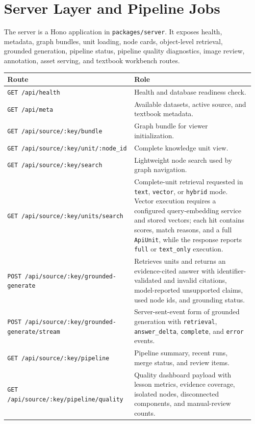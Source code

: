 \documentclass[11pt,letterpaper]{article}
\newcommand{\code}[1]{\nolinkurl{#1}}
\begin{document}
\section{Server Layer and Pipeline Jobs}
\label{sec:server-runtime}

The server is a Hono application in \code{packages/server}. It exposes health, metadata, graph bundles, unit loading, node cards, object-level retrieval, grounded generation, pipeline status, pipeline quality diagnostics, image review, annotation, asset serving, and textbook workbench routes.

\begin{table}[H]
\centering
\small
\begin{tabularx}{\textwidth}{@{}lY@{}}
\toprule
\textbf{Route} & \textbf{Role}\\
\midrule
\code{GET /api/health} & Health and database readiness check.\\
\code{GET /api/meta} & Available datasets, active source, and textbook metadata.\\
\code{GET /api/source/:key/bundle} & Graph bundle for viewer initialization.\\
\code{GET /api/source/:key/unit/:node_id} & Complete knowledge unit view.\\
\code{GET /api/source/:key/search} & Lightweight node search used by graph navigation.\\
\code{GET /api/source/:key/units/search} & Complete-unit retrieval requested in \code{text}, \code{vector}, or \code{hybrid} mode. Vector execution requires a configured query-embedding service and stored vectors; each hit contains scores, match reasons, and a full \code{ApiUnit}, while the response reports \code{full} or \code{text_only} execution.\\
\code{POST /api/source/:key/grounded-generate} & Retrieves units and returns an evidence-cited answer with identifier-validated and invalid citations, model-reported unsupported claims, used node ids, and grounding status.\\
\code{POST /api/source/:key/grounded-generate/stream} & Server-sent-event form of grounded generation with \code{retrieval}, \code{answer_delta}, \code{complete}, and \code{error} events.\\
\code{GET /api/source/:key/pipeline} & Pipeline summary, recent runs, merge status, and review items.\\
\code{GET /api/source/:key/pipeline/quality} & Quality dashboard payload with lesson metrics, evidence coverage, isolated nodes, disconnected components, and manual-review counts.\\

\end{tabularx}
\end{table}
\end{document}
